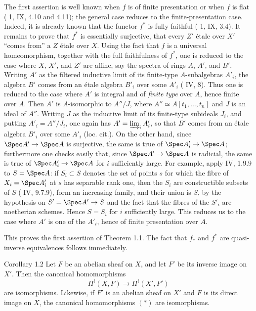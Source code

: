 The first assertion is well known when \(f\) is of finite presentation or when \(f\) is flat (\SGA{} 1, IX, 4.10 and 4.11); the general case reduces to the finite-presentation case. Indeed, it is already known that the functor \(f^*\) is fully faithful (\SGA{} 1, IX, 3.4). It remains to prove that \(f^*\) is essentially surjective, \ie that every \(Z'\) \'etale over \(X'\) ``comes from'' a \(Z\) \'etale over \(X\). Using the fact that \(f\) is a universal homeomorphism, together with the full faithfulness of \(f^*\), one is reduced to the case where \(X\), \(X'\), and \(Z'\) are affine, say the spectra of rings \(A\), \(A'\), and \(B'\). Writing \(A'\) as the filtered inductive limit of its finite-type \(A\)-subalgebras \(A'_i\), the algebra \(B'\) comes from an \'etale algebra \(B'_i\) over some \(A'_i\) (\cf \EGA{} IV, 8). Thus one is reduced to the case where \(A'\) is integral and of \emph{finite type} over \(A\), hence finite over \(A\). Then \(A'\) is \(A\)-isomorphic to \(A''/J\), where \(A''\simeq A[t_1,\ldots,t_n]\) and \(J\) is an ideal of \(A''\). Writing \(J\) as the inductive limit of its finite-type subideals \(J_i\), and putting \(A'_i=A''/J_i\), one again has \(A'=\varinjlim_i A'_i\), so that \(B'\) comes from an \'etale algebra \(B'_i\) over some \(A'_i\) (loc. cit.). On the other hand, since \(\Spec A'\to\Spec A\) is surjective, the same is true of \(\Spec A'_i\to\Spec A\); furthermore one checks easily that, since \(\Spec A'\to\Spec A\) is radicial, the same is true of \(\Spec A'_i\to\Spec A\) for \(i\) sufficiently large. For example, apply \EGA{} IV, 1.9.9 to \(S=\Spec A\): if \(S_i\subset S\) denotes the set of points \(s\) for which the fibre of \(X_i=\Spec A'_i\) at \(s\) has separable rank one, then the \(S_i\) are constructible subsets of \(S\) (\EGA{} IV, 9.7.9), form an increasing family, and their union is \(S\), by the hypothesis on \(S'=\Spec A'\to S\) and the fact that the fibres of the \(S'_i\) are noetherian schemes. Hence \(S=S_i\) for \(i\) sufficiently large. This reduces us to the case where \(A'\) is one of the \(A'_i\), hence of finite presentation over \(A\).

This proves the first assertion of Theorem 1.1. The fact that \(f_*\) and \(f^*\) are quasi-inverse equivalences follows immediately.

\begin{statement}{Corollary 1.2}
Let \(F\) be an abelian sheaf on \(X\), and let \(F'\) be its inverse image on \(X'\). Then the canonical homomorphisms
\[
H^i(X,F)\longrightarrow H^i(X',F')
\tag{*}
\]
are isomorphisms. Likewise, if \(F'\) is an abelian sheaf on \(X'\) and \(F\) is its direct image on \(X\), the canonical homomorphisms \((*)\) are isomorphisms.
\end{statement}

